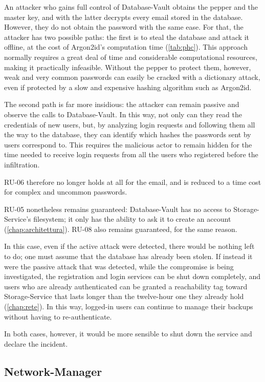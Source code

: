 An attacker who gains full control of Database-Vault obtains the pepper and the master key, and with
the latter decrypts every email stored in the database.
However, they do not obtain the password with the same ease. For that, the attacker has two possible paths:
the first is to steal the database and attack it offline, at the cost of Argon2id's computation time (\autoref{tab:phc}).
This approach normally requires a great deal of time and considerable computational resources, making it
practically infeasible.
Without the pepper to protect them, however, weak and very common passwords can easily be cracked with
a dictionary attack, even if protected by a slow and expensive hashing algorithm such as Argon2id.

The second path is far more insidious: the attacker can remain passive and observe the calls to Database-Vault.
In this way, not only can they read the credentials of new users, but, by analyzing login requests and
following them all the way to the database, they can identify which hashes the passwords sent by users correspond to.
This requires the malicious actor to remain hidden for the time needed to receive login
requests from all the users who registered before the infiltration.

RU-06 therefore no longer holds at all for the email, and is reduced to a time cost for complex and uncommon
passwords.

RU-05 nonetheless remains guaranteed: Database-Vault has no access to Storage-Service's filesystem; it only has the
ability to ask it to create an account (\autoref{chap:architettura}). RU-08 also remains guaranteed, for
the same reason.

In this case, even if the active attack were detected, there would be nothing left to do; one must assume
that the database has already been stolen.
If instead it were the passive attack that was detected, while the compromise is being investigated,
the registration and login services can be shut down completely, and users
who are already authenticated can be granted a reachability tag toward Storage-Service that lasts longer than the twelve-hour one they
already hold (\autoref{chap:rete}). In this way, logged-in users can continue to manage their
backups without having to re-authenticate.

In both cases, however, it would be more sensible to shut down the service and declare the incident.

\subsection{Network-Manager}

